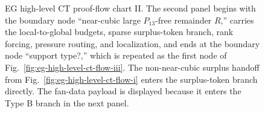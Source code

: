 \documentclass[
  11pt,
]{article}
\theoremstyle{definition}
\begin{document}
\begin{figure}[p]
{%
}
\caption[EG high-level CT proof-flow chart II]{EG high-level CT proof-flow chart II.  The second panel begins with the boundary node ``near-cubic large \(P_{13}\)-free remainder \(R\),'' carries the local-to-global budgets, sparse surplus-token branch, rank forcing, pressure routing, and localization, and ends at the boundary node ``support type?,'' which is repeated as the first node of Fig.~\ref{fig:eg-high-level-ct-flow-iii}.  The non-near-cubic surplus handoff from Fig.~\ref{fig:eg-high-level-ct-flow-i} enters the surplus-token branch directly.  The fan-data payload is displayed because it enters the Type B branch in the next panel.}
\label{fig:eg-high-level-ct-flow-ii}
\end{figure}
\end{document}
